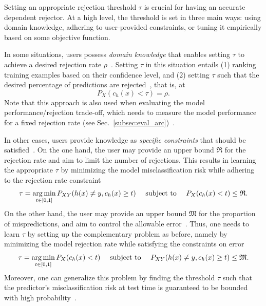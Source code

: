 Setting an appropriate rejection threshold $\tau$ is crucial for having an accurate dependent rejector. At a high level, the threshold is set in three main ways: using domain knowledge,  adhering to user-provided constraints, or tuning it empirically based on some objective function.

In some situations, users possess \emph{domain knowledge} that enables setting $\tau$ to achieve a desired rejection rate $\rho$~\citep{LeCapitaine2012,Pang2021}. Setting $\tau$ in this situation entails (1) ranking training examples based on their confidence level, and (2) setting $\tau$ such that the desired percentage of predictions are rejected~\citep{Sotgiu2020}, that is, at
\begin{equation*}
    P_X(c_h(x) < \tau) = \rho.
\end{equation*}
Note that this approach is also used when evaluating the model performance/rejection trade-off, which needs to measure the model performance for a fixed rejection rate (see Sec.~\ref{subsec:eval_arc})~\citep{Ma2001,NEURIPS2018_285e19f2,Fumera2003}.

In other cases, users provide knowledge as \emph{specific constraints} that should be satisfied~\citep{Pietraszek2005b}. On the one hand, the user may provide an upper bound $\mathfrak{R}$ for the rejection rate and aim to limit the number of rejections. This results in learning the appropriate $\tau$ by minimizing the model misclassification risk while adhering to the rejection rate constraint~\citep{Zhou2022,Pugnana2023a,Pugnana2023}
\begin{equation*}
    \tau = \operatorname*{arg\,min}_{t \in [0,1]} P_{XY}(h(x) \ne y, c_h(x) \ge t)  \quad \text{ subject to } \quad P_X(c_h(x) < t) \le \mathfrak{R}.
\end{equation*}
On the other hand, the user may provide an upper bound $\mathfrak{M}$ for the proportion of mispredictions, and aim to control the allowable error~\citep{Varshney2011,Sayedi2010}. Thus, one needs to learn $\tau$ by setting up the complementary problem as before, namely by minimizing the model rejection rate while satisfying the constraints on error~\citep{Li2006,Franc2019,Franc2021}
\begin{equation*}
    \tau = \operatorname*{arg\,min}_{t \in [0,1]} P_X(c_h(x) < t) \quad \text{ subject to } \quad P_{XY}(h(x) \ne y, c_h(x) \ge t) \le \mathfrak{M}.
\end{equation*}
Moreover, one can generalize this problem by finding the threshold $\tau$ such that the predictor’s misclassification risk at test time is guaranteed to be bounded with high probability~\citep{NIPS2017_7073}.


